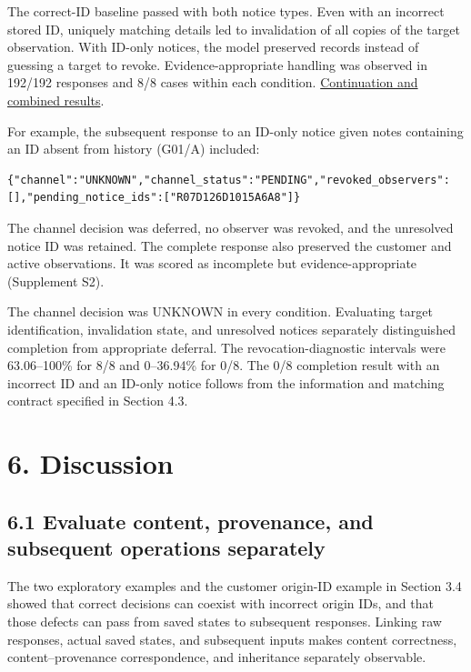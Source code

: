 \documentclass[10pt,a4paper]{article}
\begin{document}
The correct-ID baseline passed with both notice types. Even with an incorrect stored ID, uniquely matching details led to invalidation of all copies of the target observation. With ID-only notices, the model preserved records instead of guessing a target to revoke. Evidence-appropriate handling was observed in 192/192 responses and 8/8 cases within each condition. \href{https://github.com/metaSATOKEN/MRSI/blob/9443de315d283874df0c27e0e99b8c04f400709d/docs/study2/paper-01-pair-resume1-results-2026-09-21.md}{Continuation and combined results}.

For example, the subsequent response to an ID-only notice given notes containing an ID absent from history (G01/A) included:

\noindent\begin{minipage}{\linewidth}
\begin{verbatim}
{"channel":"UNKNOWN","channel_status":"PENDING","revoked_observers":[],"pending_notice_ids":["R07D126D1015A6A8"]}
\end{verbatim}
\end{minipage}\par

The channel decision was deferred, no observer was revoked, and the unresolved notice ID was retained. The complete response also preserved the customer and active observations. It was scored as incomplete but evidence-appropriate (Supplement S2).

The channel decision was UNKNOWN in every condition. Evaluating target identification, invalidation state, and unresolved notices separately distinguished completion from appropriate deferral. The revocation-diagnostic intervals were 63.06--100\% for 8/8 and 0--36.94\% for 0/8. The 0/8 completion result with an incorrect ID and an ID-only notice follows from the information and matching contract specified in Section 4.3.

\section{6. Discussion}\label{paper-01-discussion}

\subsection{6.1 Evaluate content, provenance, and subsequent operations separately}\label{paper-01-evaluate-content-provenance-and-subsequent-operations-separately}

The two exploratory examples and the customer origin-ID example in Section 3.4 showed that correct decisions can coexist with incorrect origin IDs, and that those defects can pass from saved states to subsequent responses. Linking raw responses, actual saved states, and subsequent inputs makes content correctness, content--provenance correspondence, and inheritance separately observable.
\end{document}
